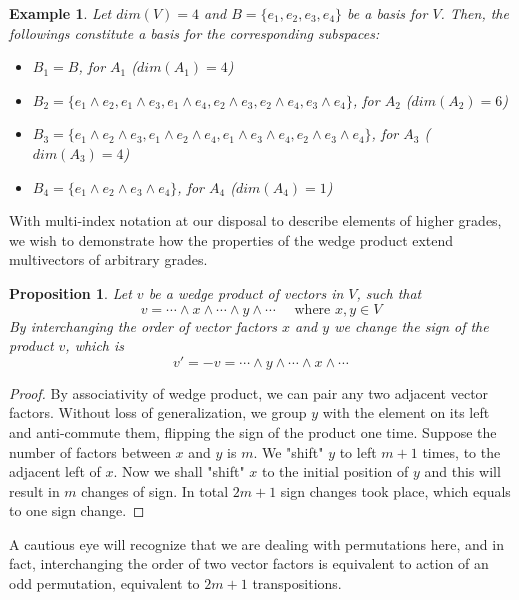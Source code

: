 \documentclass[12pt]{article}
\newtheorem{proposition}[theorem]{Proposition}
\newtheorem{example}[theorem]{Example}
\numberwithin{theorem}{section}
\numberwithin{equation}{theorem}
\begin{document}
\begin{example}
    Let $dim(V) = 4$ and $B = \{e_1, e_2, e_3, e_4\}$ be a basis for $V$. Then, the followings constitute a basis for the corresponding subspaces:
    \begin{itemize}
        \item $B_1 = B$, for $A_1$ ($dim(A_1) = 4$)
        \item $B_2 = \{e_1 \wedge e_2, e_1 \wedge e_3, e_1 \wedge e_4, e_2 \wedge e_3, e_2 \wedge e_4, e_3 \wedge e_4\}$, for $A_2$ ($dim(A_2) = 6$)
        \item $B_3 = \{e_1 \wedge e_2 \wedge e_3, e_1 \wedge e_2 \wedge e_4, e_1 \wedge e_3 \wedge e_4, e_2 \wedge e_3 \wedge e_4\}$, for $A_3$ ($dim(A_3) = 4$)
        \item $B_4 = \{e_1 \wedge e_2 \wedge e_3 \wedge e_4\}$, for $A_4$ ($dim(A_4) = 1$)
        
        
    \end{itemize}
\end{example}

With multi-index notation at our disposal to describe elements of higher grades, we wish to demonstrate how the properties of the wedge product extend multivectors of arbitrary grades.

\begin{proposition}
    Let $v$ be a wedge product of vectors in $V$, such that $$v = \cdots \wedge x \wedge \cdots \wedge y \wedge \cdots \quad \text{ where } x, y \in V$$ By interchanging the order of vector factors $x$ and $y$ we change the sign of the product $v$, which is $$v' = -v = \cdots \wedge y \wedge \cdots \wedge x \wedge \cdots$$
\end{proposition}
\begin{proof}
    By associativity of wedge product, we can pair any two adjacent vector factors. Without loss of generalization, we group $y$ with the element on its left and anti-commute them, flipping the sign of the product one time. Suppose the number of factors between $x$ and $y$ is $m$. We "shift" $y$ to left $m+1$ times, to the adjacent left of $x$. Now we shall "shift" $x$ to the initial position of $y$ and this will result in $m$ changes of sign. In total $2m+1$ sign changes took place, which equals to one sign change. 
\end{proof}

A cautious eye will recognize that we are dealing with permutations here, and in fact, interchanging the order of two vector factors is equivalent to action of an odd permutation, equivalent to $2m+1$ transpositions.
\end{document}
